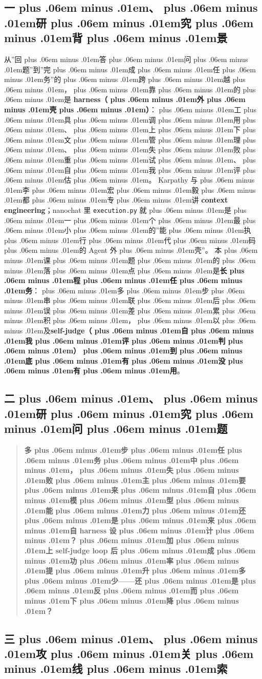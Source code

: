 \documentclass[
]{article}
\newcommand{\passthrough}[1]{#1}
\def\zh#1{{\zhfont #1}}
\def\zhglue{\hskip0pt plus .06em minus .01em}
\begin{document}
\subsection{\zh{一\zhglue 、\zhglue 研\zhglue 究\zhglue 背\zhglue 景}}\label{ux4e00ux7814ux7a76ux80ccux666f-8}

\zh{从}''\zh{回\zhglue 答\zhglue 问\zhglue 题}''\zh{到}''\zh{完\zhglue 成\zhglue 任\zhglue 务}''\zh{的\zhglue 跨\zhglue 越\zhglue ，\zhglue 靠\zhglue 的\zhglue 是} \textbf{harness\zh{（\zhglue 外\zhglue 壳\zhglue ）}}\zh{：\zhglue 工\zhglue 具\zhglue 调\zhglue 用\zhglue 、\zhglue 上\zhglue 下\zhglue 文\zhglue 管\zhglue 理\zhglue 、\zhglue 失\zhglue 败\zhglue 重\zhglue 试\zhglue 、\zhglue 自\zhglue 我\zhglue 评\zhglue 估\zhglue 。} Karpathy \zh{与\zhglue 李\zhglue 宏\zhglue 毅\zhglue 都\zhglue 专\zhglue 讲} \textbf{context engineering}\zh{；}nanochat \zh{里} \passthrough{\lstinline!execution.py!} \zh{就\zhglue 是\zhglue 一\zhglue 个\zhglue 最\zhglue 小\zhglue 的}''\zh{能\zhglue 执\zhglue 行\zhglue 代\zhglue 码\zhglue 的} Agent \zh{外\zhglue 壳}''\zh{。} \zh{本\zhglue 课\zhglue 题\zhglue 的\zhglue 落\zhglue 点\zhglue 是}\textbf{\zh{长\zhglue 程\zhglue 任\zhglue 务}}\zh{：\zhglue 多\zhglue 步\zhglue 串\zhglue 联\zhglue 后\zhglue 误\zhglue 差\zhglue 累\zhglue 积\zhglue ，\zhglue 以\zhglue 及}\textbf{self-judge\zh{（\zhglue 自\zhglue 我\zhglue 评\zhglue 判\zhglue ）\zhglue 到\zhglue 底\zhglue 有\zhglue 没\zhglue 有\zhglue 用}}\zh{。}

\subsection{\zh{二\zhglue 、\zhglue 研\zhglue 究\zhglue 问\zhglue 题}}\label{ux4e8cux7814ux7a76ux95eeux9898-4}

\begin{quote}
\textbf{\zh{多\zhglue 步\zhglue 任\zhglue 务\zhglue 中\zhglue ，\zhglue 失\zhglue 败\zhglue 主\zhglue 要\zhglue 来\zhglue 自\zhglue 模\zhglue 型\zhglue 能\zhglue 力\zhglue 还\zhglue 是\zhglue 来\zhglue 自} harness \zh{设\zhglue 计\zhglue ？\zhglue 加\zhglue 上} self-judge loop \zh{后\zhglue 成\zhglue 功\zhglue 率\zhglue 提\zhglue 升\zhglue 多\zhglue 少}------\zh{还\zhglue 是\zhglue 反\zhglue 而\zhglue 下\zhglue 降\zhglue ？}}
\end{quote}

\subsection{\zh{三\zhglue 、\zhglue 攻\zhglue 关\zhglue 线\zhglue 索}}\label{ux4e09ux653bux5173ux7ebfux7d22-8}
\end{document}
